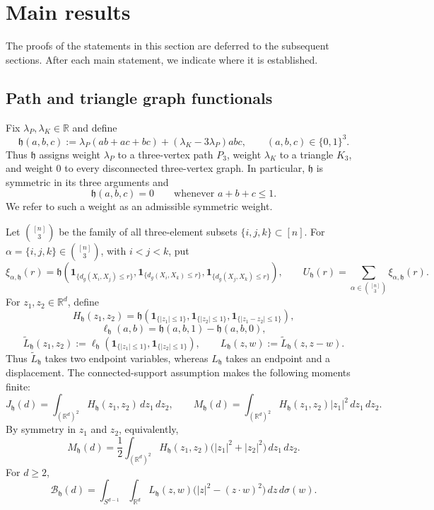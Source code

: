 \documentclass[11pt]{article}
\theoremstyle{remark}
\newcommand{\ind}{\mathbf 1}
\numberwithin{equation}{section}
\begin{document}
\section{Main results}
\label{sec:main-results}

The proofs of the statements in this section are deferred to the
subsequent sections.  After each main statement, we indicate where it is
established.

\subsection{Path and triangle graph functionals}
\label{subsec:three-point-statement}

Fix $\lambda_P,\lambda_K\in\mathbb R$ and define
\[
\mathfrak h(a,b,c)
:=
\lambda_P(ab+ac+bc)
+
(\lambda_K-3\lambda_P)abc,
\qquad
(a,b,c)\in\{0,1\}^3.
\]
Thus $\mathfrak h$ assigns weight $\lambda_P$ to a three-vertex path
$P_3$, weight $\lambda_K$ to a triangle $K_3$, and weight $0$ to every
disconnected three-vertex graph.  In particular, $\mathfrak h$ is symmetric
in its three arguments and
\[
\mathfrak h(a,b,c)=0
\qquad\text{whenever }a+b+c\le1.
\]
We refer to such a weight as an admissible symmetric weight.

Let $\binom{[n]}{3}$ be the family of all three-element subsets
$\{i,j,k\}\subset[n]$.  For
$\alpha=\{i,j,k\}\in\binom{[n]}{3}$, with $i<j<k$, put
\[
\xi_{\alpha,\mathfrak h}(r)
=\mathfrak h\!\left(
\ind_{\{d_g(X_i,X_j)\le r\}},
\ind_{\{d_g(X_i,X_k)\le r\}},
\ind_{\{d_g(X_j,X_k)\le r\}}
\right),
\qquad
U_{\mathfrak h}(r)
=\sum_{\alpha\in\binom{[n]}{3}}\xi_{\alpha,\mathfrak h}(r).
\]
For $z_1,z_2\in\mathbb R^d$, define
\[
H_{\mathfrak h}(z_1,z_2)
=\mathfrak h\!\left(
\ind_{\{|z_1|\le1\}},
\ind_{\{|z_2|\le1\}},
\ind_{\{|z_1-z_2|\le1\}}
\right),
\]
\[
\ell_{\mathfrak h}(a,b)
=\mathfrak h(a,b,1)-\mathfrak h(a,b,0),
\]
\[
\widetilde L_{\mathfrak h}(z_1,z_2)
:=\ell_{\mathfrak h}\!\left(
\ind_{\{|z_1|\le1\}},
\ind_{\{|z_2|\le1\}}
\right),
\qquad
L_{\mathfrak h}(z,w)
:=\widetilde L_{\mathfrak h}(z,z-w).
\]
Thus $\widetilde L_{\mathfrak h}$ takes two endpoint variables, whereas
$L_{\mathfrak h}$ takes an endpoint and a displacement.  The
connected-support assumption makes the following moments finite:
\[
J_{\mathfrak h}(d)
=\int_{(\mathbb R^d)^2}
H_{\mathfrak h}(z_1,z_2)\,dz_1\,dz_2,
\qquad
M_{\mathfrak h}(d)
=\int_{(\mathbb R^d)^2}
H_{\mathfrak h}(z_1,z_2)|z_1|^2\,dz_1\,dz_2.
\]
By symmetry in $z_1$ and $z_2$, equivalently,
\[
M_{\mathfrak h}(d)
=
\frac12
\int_{(\mathbb R^d)^2}
H_{\mathfrak h}(z_1,z_2)
\bigl(|z_1|^2+|z_2|^2\bigr)\,dz_1\,dz_2.
\]
For $d\ge2$,
\[
\mathcal B_{\mathfrak h}(d)
=\int_{S^{d-1}}\int_{\mathbb R^d}
L_{\mathfrak h}(z,w)
\bigl(|z|^2-(z\cdot w)^2\bigr)\,dz\,d\sigma(w).
\]
\end{document}
